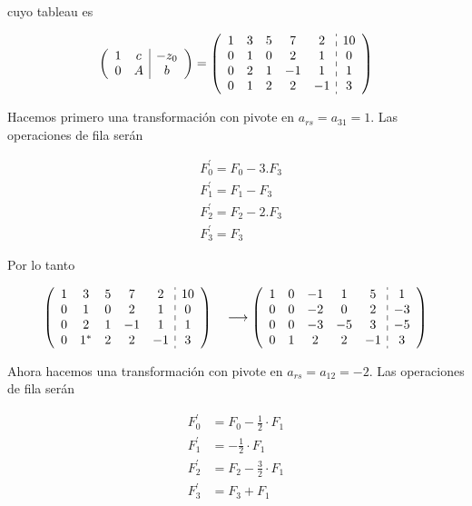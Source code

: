 \documentclass[10pt]{article}
\begin{document}
cuyo tableau es

$$
\left(\begin{array}{cc|c}
1 & c & -z_{0} \\
0 & A & b
\end{array}\right)=\left(\begin{array}{ccccc:c}
1 & 3 & 5 & 7 & 2 & 10 \\
0 & 1 & 0 & 2 & 1 & 0 \\
0 & 2 & 1 & -1 & 1 & 1 \\
0 & 1 & 2 & 2 & -1 & 3
\end{array}\right)
$$

Hacemos primero una transformación con pivote en $a_{r s}=a_{31}=1$. Las operaciones de fila serán

$$
\begin{aligned}
& F_{0}^{\prime}=F_{0}-3 . F_{3} \\
& F_{1}^{\prime}=F_{1}-F_{3} \\
& F_{2}^{\prime}=F_{2}-2 . F_{3} \\
& F_{3}^{\prime}=F_{3}
\end{aligned}
$$

Por lo tanto

$$
\left(\begin{array}{ccccc:c}
1 & 3 & 5 & 7 & 2 & 10 \\
0 & 1 & 0 & 2 & 1 & 0 \\
0 & 2 & 1 & -1 & 1 & 1 \\
0 & 1^{*} & 2 & 2 & -1 & 3
\end{array}\right) \quad \longrightarrow\left(\begin{array}{ccccc:c}
1 & 0 & -1 & 1 & 5 & 1 \\
0 & 0 & -2 & 0 & 2 & -3 \\
0 & 0 & -3 & -5 & 3 & -5 \\
0 & 1 & 2 & 2 & -1 & 3
\end{array}\right)
$$

Ahora hacemos una transformación con pivote en $a_{r s}=a_{12}=-2$. Las operaciones de fila serán

$$
\begin{aligned}
F_{0}^{\prime} & =F_{0}-\frac{1}{2} \cdot F_{1} \\
F_{1}^{\prime} & =-\frac{1}{2} \cdot F_{1} \\
F_{2}^{\prime} & =F_{2}-\frac{3}{2} \cdot F_{1} \\
F_{3}^{\prime} & =F_{3}+F_{1}
\end{aligned}
$$
\end{document}
